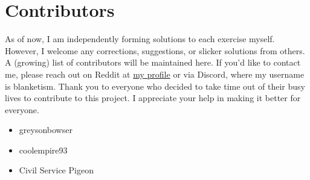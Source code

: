 \section*{Contributors}

As of now, I am independently forming solutions to each exercise myself.
However, I welcome any corrections, suggestions, or slicker solutions from others.
A (growing) list of contributors will be maintained here.
If you'd like to contact me, please reach out on Reddit at \href{https://www.reddit.com/user/ansv9a8fdh3/}{my profile} or via Discord, where my username is blanketism.
Thank you to everyone who decided to take time out of their busy lives to contribute to this project.
I appreciate your help in making it better for everyone.
\begin{itemize}
    \item greysonbowser
    \item coolempire93
    \item Civil Service Pigeon
\end{itemize}
